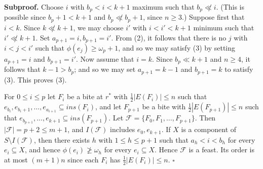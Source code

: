 \textbf{Subproof.} Choose $i$ with $b_p < i < k + 1$ maximum such that $b_p \not\ll i$. (This is possible since $b_p + 1 < k + 1$ and $b_p \not\ll b_p + 1$, since $n \ge 3$.) Suppose first that $i < k$. Since $k \not\ll k + 1$, we may choose $i'$ with $i < i' < k + 1$ minimum such that $i' \not\ll k + 1$. Set $a_{p+1} = i, b_{p+1} = i'$. From (2), it follows that there is no $j$ with $i < j < i'$ such that $\phi(e_j) \ge \omega_p + 1$, and so we may satisfy (3) by setting $a_{p+1} = i$ and $b_{p+1} = i'$. Now assume that $i = k$. Since $b_p \ll k + 1$ and $n \ge 4$, it follows that $k - 1 > b_p$; and so we may set $a_{p+1} = k - 1$ and $b_{p+1} = k$ to satisfy (3). This proves (3).

For $0 \le i \le p$ let $F_i$ be a bite at $r^*$ with $\frac{1}{2}|E(F_i)| \le n$ such that $e_{b_i}, e_{b_i+1}, \dots, e_{a_{i+1}} \subseteq ins(F_i)$, and let $F_{p+1}$ be a bite with $\frac{1}{2}|E(F_{p+1})| \le n$ such that $e_{b_{p+1}}, \dots, e_{k+1} \subseteq ins(F_{p+1})$. Let $\mathscr{F} = \{F_0, F_1, \dots, F_{p+1}\}$. Then $|\mathscr{F}| = p + 2 \le m + 1$, and $I(\mathscr{F})$ includes $e_0, e_{k+1}$. If $X$ is a component of $S \setminus I(\mathscr{F})$, then there exists $h$ with $1 \le h \le p + 1$ such that $a_h < i < b_h$ for every $e_i \subseteq X$, and hence $\phi(e_i) \not\ge \omega_h$ for every $e_i \subseteq X$. Hence $\mathscr{F}$ is a feast. Its order is at most $(m + 1)n$ since each $F_i$ has $\frac{1}{2}|E(F_i)| \le n$. $\square$

